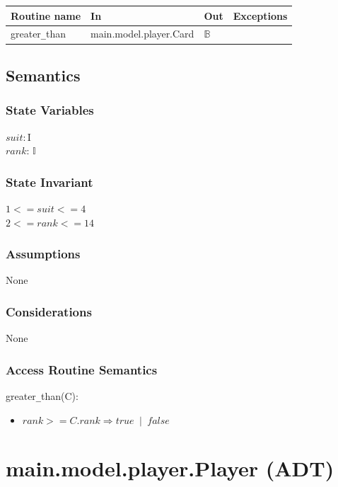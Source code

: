 \documentclass[12pt, titlepage]{article}
\begin{document}
\begin{tabular}{| l | l | l | p{5cm} |}
\hline
\textbf{Routine name} & \textbf{In} & \textbf{Out} & \textbf{Exceptions}\\
\hline
greater\verb|_|than & main.model.player.Card & $\mathbb{B}$ &\\
\hline
\end{tabular}

\subsection* {Semantics}

\subsubsection* {State Variables}

$\mathit{suit}: \text{I}$\\
$\mathit{rank}$: $\mathbb{I}$

\subsubsection* {State Invariant}

$1 <= \mathit{suit} <= 4$\\
$2 <= \mathit{rank} <= 14$

\subsubsection* {Assumptions}

None

\subsubsection* {Considerations}

None

\subsubsection* {Access Routine Semantics}

\noindent greater\verb|_|than(C):
\begin{itemize}
\item $rank >= C.rank \Longrightarrow true \phantom{a}|\phantom{a} false$ 

\end{itemize}

\section* {main.model.player.Player (ADT)}
\end{document}
